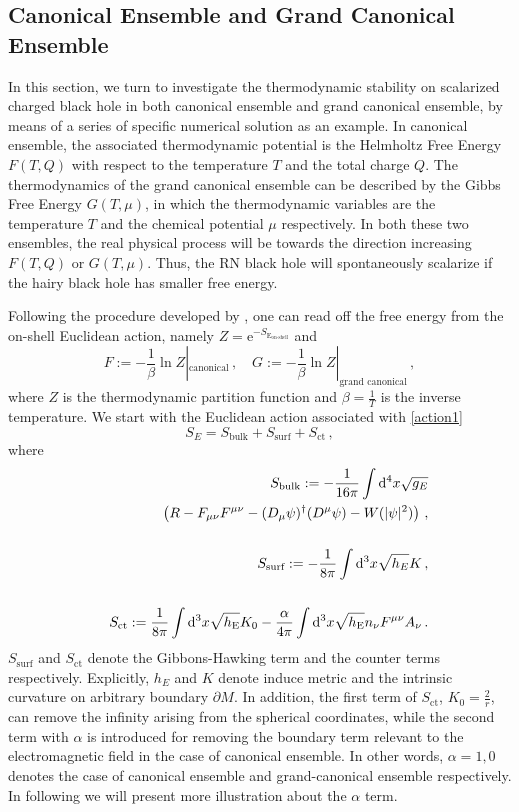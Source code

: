 \documentclass[pr, twocolumn, preprintnumbers, showpacs,footnoteadded, superscriptaddress,nofootinbib,longbibliography]{revtex4-1}
\newcommand{\td}{\mathrm{d}}
\newcommand{\te}{\mathrm{e}}
\begin{document}
\subsection{Canonical Ensemble and Grand Canonical Ensemble}
In this section, we turn to investigate the thermodynamic stability on scalarized charged black hole in both canonical ensemble and grand canonical ensemble, by means of  a series of specific numerical solution as an example. In canonical ensemble, the associated thermodynamic potential is the Helmholtz Free Energy $F(T,Q)$ with respect to the temperature $T$ and the total charge $Q$. The thermodynamics of the grand canonical ensemble can be described by the Gibbs Free Energy $G(T,\mu)$, in which the thermodynamic variables are the temperature $T$ and the chemical potential $\mu$ respectively. In both these two ensembles, the real physical process will be towards the direction increasing $F(T,Q)$ or $G(T,\mu)$. Thus, the RN black hole will spontaneously scalarize if the hairy black hole has smaller free energy.

Following the procedure developed by \cite{Gibbons:1976ue,Caldarelli:1999xj}, one can read off the free energy from the on-shell Euclidean action, namely $Z=\te^{-S_{\text{E}_{\text{on-shell}}}}$ and
%
\begin{equation}
F:=-\frac{1}{\beta}\ln Z|_{\text{canonical}}\,, \quad G:=-\frac{1}{\beta}\ln Z|_{\text{grand canonical}}\, ,
\end{equation}
%
where $Z$ is the thermodynamic partition function and $\beta=\frac{1}{T}$ is the inverse temperature. We start with the Euclidean action associated with \eqref{action1}
%
\begin{equation}\label{Eaction1}
S_E=S_{\text{bulk}}+S_{\text{surf}}+S_{\text{ct}} \, ,
\end{equation}
%
where
%
\begin{eqnarray}
&&S_{\text{bulk}}:=-\frac1{16\pi}\int \td^4 x \sqrt{g_E} \cr
&& \left(R-F_{\mu\nu}F^{\mu\nu}-(D_\mu\psi)^\dagger(D^\mu\psi)-W(|\psi|^2)\right)\, , \\
~ \cr
&&S_{\text{surf}} := -\frac{1}{8\pi}\int \td^3 x \sqrt{h_E}K \, , \\
~ \cr
&&S_{\text{ct}} := \frac{1}{8\pi}\int\td^3 x \sqrt{h_{\rm E}}K_0 -\frac{\alpha}{4\pi}\int \td^3 x \sqrt{h_{\rm E}} n_\nu F^{\mu\nu}A_\nu \, .
\end{eqnarray}
%
$S_{\text{surf}}$ and $S_{\text{ct}}$ denote the Gibbons-Hawking term and the counter terms respectively. Explicitly, $h_E$ and $K$ denote induce metric and the intrinsic curvature on arbitrary boundary $\partial M$. In addition, the first term of $S_{\text{ct}}$, $K_0 = \frac{2}{r}$, can remove the infinity arising from the spherical coordinates, while the second term with $\alpha$ is introduced for removing the boundary term relevant to the  electromagnetic field in the case of canonical ensemble. In other words, $\alpha=1,0$ denotes the case of canonical ensemble and grand-canonical ensemble respectively. In following we will present more illustration about the $\alpha$ term.
\end{document}
